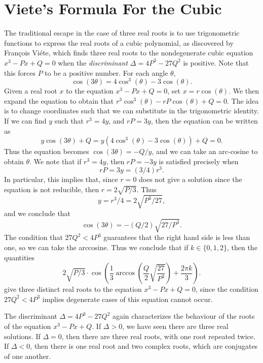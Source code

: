 \section{Viete's Formula For the Cubic}

The traditional escape in the case of three real roots is to use trigonometric functions to express the real roots of a cubic polynomial, as discovered by Fran\c{c}ois Vi\'{e}te, which finds three real roots to the nondegenerate cubic equation $x^3 - Px + Q = 0$ when the \emph{discriminant} $\Delta = 4P^3 - 27Q^2$ is positive. Note that this forces $P$ to be a positive number. For each angle $\theta$,
%
\[ \cos(3 \theta) = 4 \cos^3(\theta) - 3 \cos(\theta). \]
%
Given a real root $x$ to the equation $x^3 - Px + Q = 0$, set $x = r \cos(\theta)$. We then expand the equation to obtain that $r^3 \cos^3(\theta) - r P \cos(\theta) + Q = 0$. The idea is to change coordinates such that we can substitute in the trigonometric identity. If we can find $y$ such that $r^3 = 4y$, and $rP = 3y$, then the equation can be written as
%
\[ y \cos(3 \theta) + Q = y(4 \cos^3(\theta) - 3 \cos(\theta)) + Q = 0. \]
%
Thus the equation becomes $\cos(3\theta) = -Q/y$, and we can take an arc-cosine to obtain $\theta$. We note that if $r^3 = 4y$, then $rP = -3y$ is satisfied precisely when
%
\[ rP = 3y = (3/4)r^3. \]
%
In particular, this implies that, since $r = 0$ does not give a solution since the equation is not reducible, then $r = 2 \sqrt{P/3}$. Thus
%
\[ y = r^3/4 = 2 \sqrt{P^3/27}, \]
%
and we conclude that
%
\[ \cos(3\theta) = - (Q/2) \sqrt{27/P^3}. \]
%
The condition that $27 Q^2 < 4P^3$ guarantees that the right hand side is less than one, so we can take the arccosine. Thus we conclude that if $k \in \{ 0, 1 , 2 \}$, then the quantities
%
\[ 2 \sqrt{P/3} \cdot \cos \left( \frac{1}{3} \arccos \left( \frac{Q}{2} \sqrt{\frac{27}{P^3}} \right) + \frac{2 \pi k}{3} \right). \]
%
give three distinct real roots to the equation $x^3 - Px + Q = 0$, since the condition $27Q^2 < 4P^3$ implies degenerate cases of this equation cannot occur.

\begin{remark}
	The discriminant $\Delta = 4P^3 - 27Q^2$ again characterizes the behaviour of the roots of the equation $x^3 - Px + Q$. If $\Delta > 0$, we have seen there are three real solutions. If $\Delta = 0$, then there are three real roots, with one root repeated twice. If $\Delta < 0$, then there is one real root and two complex roots, which are conjugates of one another.
\end{remark}

